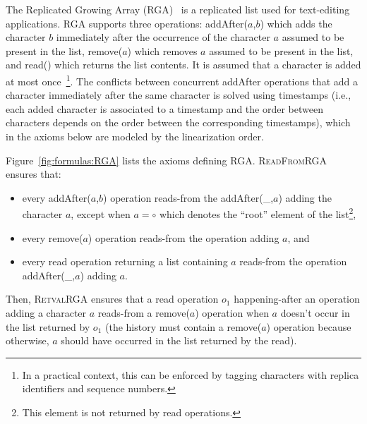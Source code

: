 The Replicated Growing Array (RGA)~\cite{RohJKL11} is a replicated list used for text-editing applications.
%
RGA supports three operations:
{\sf addAfter}($a$,$b$) which adds the character
  $b$
  immediately after the occurrence of the character $a$
  assumed to be present in the list,
  {\sf remove}($a$) which removes $a$
  assumed to be present in the list, and
{\sf read}() which returns the list contents.
It is assumed that a character is added at most once~\footnote{In a practical context, this can be enforced by tagging characters with replica identifiers and sequence numbers.}.
The conflicts between concurrent {\sf addAfter} operations that add a character immediately after the same character is solved using timestamps (i.e., each added character is associated to a timestamp and the order between characters depends on the order between the corresponding timestamps), which in the axioms below are modeled by the linearization order.

Figure~\ref{fig:formulas:RGA} lists the axioms defining RGA. \textsc{ReadFromRGA} ensures that:
\vspace{-1.5mm}
\begin{itemize}
\item every {\sf addAfter}($a$,$b$) operation reads-from the {\sf addAfter}(\_,$a$) adding the character $a$, except when $a=\circ$ which denotes the ``root'' element of the list\footnote{This element is not returned by {\sf read} operations.}, 
\item every {\sf remove}($a$) operation reads-from the operation adding $a$, and 
\item every {\sf read} operation returning a list containing $a$ reads-from the operation {\sf addAfter}(\_,$a$)  adding $a$. 
\vspace{-1.5mm}
\end{itemize}

Then, \textsc{RetvalRGA} ensures that a {\sf read} operation $o_1$ happening-after an operation adding a character $a$ reads-from a {\sf remove}($a$) operation when $a$ doesn't occur in the list returned by $o_1$ (the history must contain a {\sf remove}($a$) operation because otherwise, $a$ should have occurred in the list returned by the {\sf read}). 

